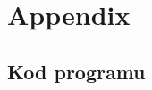 \documentclass[12pt]{article}
\begin{document}
\newpage
\section*{Appendix}
\subsection*{Kod programu}

\end{document}
